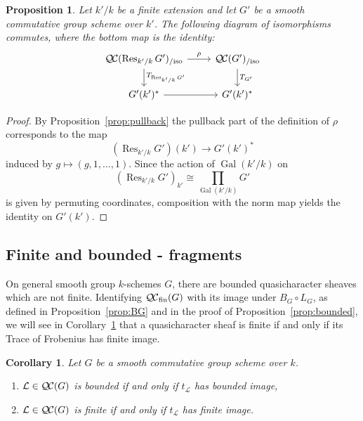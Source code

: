 \documentclass{amsart}
\theoremstyle{plain}
\newtheorem{proposition}[theorem]{Proposition}
\newtheorem{corollary}[theorem]{Corollary}
\theoremstyle{definition}
\theoremstyle{remark}
\newcommand{\Fq}{k}
\DeclareMathOperator{\Gal}{Gal}
\DeclareMathOperator{\Res}{Res}
\newcommand{\qcs}[1]{{\mathcal{#1}}}
\newcommand{\QC}{{\mathcal{Q\hskip-0.8pt C}}}
\newcommand{\fQC}{{\QC_\text{fin}}}
\newcommand{\QCiso}[1]{\QC(#1)_{/\text{iso}}}
\newcommand{\trFrob}[1]{t_{#1}}
\newcommand{\TrFrob}[1]{T_{#1}}
\begin{document}
\begin{proposition}
Let $k'/k$ be a finite extension and let $G'$ be a smooth commutative group scheme over $k'$.
The following diagram of isomorphisms commutes, where the bottom map is the identity:
\[
\begin{tikzcd}
\QCiso{\Res_{k'/k} G'} \dar{\TrFrob{\Res_{k'/k} G'}} \rar{\rho} & \QCiso{G'} \dar{\TrFrob{G'}}\\
G'(k')^* \rar & G'(k')^*
\end{tikzcd}
\]
\end{proposition}
\begin{proof}
By Proposition~\ref{prop:pullback} the pullback part of the definition of $\rho$ corresponds to the map
\[
(\Res_{k'/k}G')(k') \to G'(k')^*
\]
induced by $g \mapsto (g, 1, \ldots, 1)$.  Since the action of $\Gal(k'/k)$ on
\[
(\Res_{k'/k}G')_{k'} \cong \prod_{\Gal(k'/k)} G'
\]
is given by permuting coordinates, composition with the norm map yields the identity on $G'(k')$.
\end{proof}


\subsection{Finite and bounded - fragments}


On general smooth group $\Fq$-schemes $G$, 
there are bounded quasicharacter sheaves which are not finite.  
Identifying $\fQC(G)$ with its image under $B_G \circ L_G$, as defined in
Proposition~\ref{prop:BG} and in the proof of Proposition~\ref{prop:bounded},
we will see in Corollary~\ref{cor:bounded-and-finite} that
a quasicharacter sheaf is finite if and only if its Trace of Frobenius has finite image.

\begin{corollary} \label{cor:bounded-and-finite}
Let $G$ be a smooth commutative group scheme over $\Fq$.
\begin{enumerate}
\item $\qcs{L} \in \QC(G)$ is bounded if and only if $\trFrob{\qcs{L}}$ has bounded image,
\item $\qcs{L}\in \QC(G)$ is finite if and only if $\trFrob{\qcs{L}}$ has finite image.
\end{enumerate}
\end{corollary}
\end{document}
